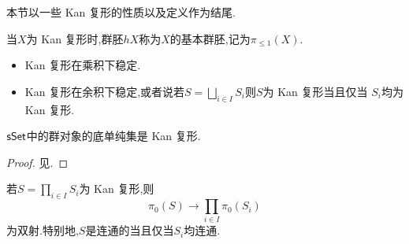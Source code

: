 本节以一些 Kan 复形的性质以及定义作为结尾.
\begin{definition}\label{定义:Kan 复形的基本群胚}
    当$X$为 Kan 复形时,群胚$hX$称为$X$的基本群胚,记为$\pi_{\leq 1}(X)$.
\end{definition}
\begin{example}
    \begin{itemize}
        \item Kan 复形在乘积下稳定.
        \item Kan 复形在余积下稳定,或者说若$S = \bigsqcup_{i\in I}S_i$则$S$为 Kan 复形当且仅当 $S_i$均为 Kan 复形.
    \end{itemize}
\end{example}
\begin{proposition}
    $\mathsf{sSet}$中的群对象的底单纯集是 Kan 复形.
\end{proposition}
\begin{proof}
    见\parencite[\href{https://kerodon.net/tag/00MG}{00MG}]{Kerodon}.
\end{proof}
\begin{proposition}\label{命题: Kan 复形乘积的连通性}
    若$S = \prod_{i\in I}S_i$为 Kan 复形,则
    \[
        \pi_0(S) \to \prod_{i\in I}\pi_0(S_i)
    \]
    为双射.特别地,$S$是连通的当且仅当$S_i$均连通.
\end{proposition}

